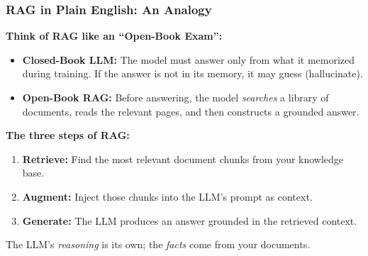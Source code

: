 \begin{frame}[fragile]\frametitle{RAG in Plain English: An Analogy}

\textbf{Think of RAG like an ``Open-Book Exam'':}

\begin{itemize}
  \item \textbf{Closed-Book LLM:} The model must answer only from what it memorized during training. If the answer is not in its memory, it may guess (hallucinate).

  \item \textbf{Open-Book RAG:} Before answering, the model \textit{searches} a library of documents, reads the relevant pages, and then constructs a grounded answer.
\end{itemize}

\vspace{0.5em}
\textbf{The three steps of RAG:}
\begin{enumerate}
  \item \textbf{Retrieve:} Find the most relevant document chunks from your knowledge base.
  \item \textbf{Augment:} Inject those chunks into the LLM's prompt as context.
  \item \textbf{Generate:} The LLM produces an answer grounded in the retrieved context.
\end{enumerate}

\vspace{0.3em}
{\small The LLM's \textit{reasoning} is its own; the \textit{facts} come from your documents.}

\end{frame}









